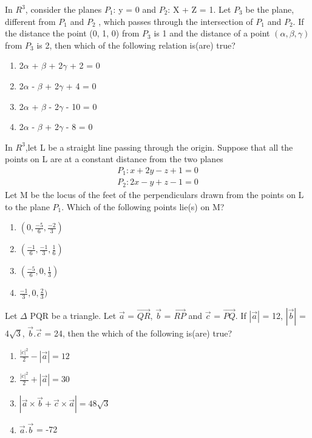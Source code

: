 \item In $R^{3}$, consider the planes $P_1$: y = 0 and $P_2$: X + Z = 1. Let $P_3$ be the plane, different from $P_1$ and $P_2$ , which passes through the intersection of $P_1$ and $P_2$. If the distance the point (0, 1, 0) from $P_3$ is 1 and the distance of a point $(\alpha, \beta, \gamma)$ from $P_3$ is 2, then which of the following relation is(are) true?
\begin{enumerate}
\item 2$\alpha$ + $\beta$ + 2$\gamma$ + 2 = 0
\item 2$\alpha$ - $\beta$ + 2$\gamma$ + 4 = 0
\item 2$\alpha$ + $\beta$ - 2$\gamma$ - 10 = 0
\item 2$\alpha$ - $\beta$ + 2$\gamma$ - 8 = 0
\end{enumerate} 

\item In $R^{3}$,let L be a straight line passing through the origin. Suppose that all the points on L are at a constant distance from the two planes 
\begin{align*}
P_1: x + 2y - z + 1 = 0
\end{align*}
\begin{align*}
P_2: 2x - y + z - 1 = 0
\end{align*}
Let M be the locus of the feet of the perpendiculars drawn from the points on L to the plane $P_1$. Which of the following points lie(s) on M?
\begin{enumerate}
\item $(0, \frac{-5}{6}, \frac{-2}{3})$
\item $(\frac{-1}{6}, \frac{-1}{3}, \frac{1}{6})$
\item $(\frac{-5}{6}, 0, \frac{1}{3})$
\item $\frac{-1}{3}, 0, \frac{2}{3})$
\end{enumerate}

\item Let $\Delta$ PQR be a triangle. Let $\overrightarrow{a}$ = $\overrightarrow{QR}$, $\overrightarrow{b}$ = 
$\overrightarrow{RP}$ and $\overrightarrow{c}$ = $\overrightarrow{PQ}$. If $|\overrightarrow{a}|$ = 12, 
$|\overrightarrow{b}|$ = 4$\sqrt{3}$, $\overrightarrow{b}.\overrightarrow{c}$ = 24, then the which of the following is(are) true?
\begin{enumerate}
\item $\frac{|c|^{2}}{2} - |\overrightarrow{a}| = 12$
\item $\frac{|c|^{2}}{2} + |\overrightarrow{a}| = 30$
\item $|\overrightarrow{a} \times \overrightarrow{b} + \overrightarrow{c} \times \overrightarrow{a}| = 48\sqrt{3}$
\item $\overrightarrow{a}$.$\overrightarrow{b}$ = -72
\end{enumerate}


